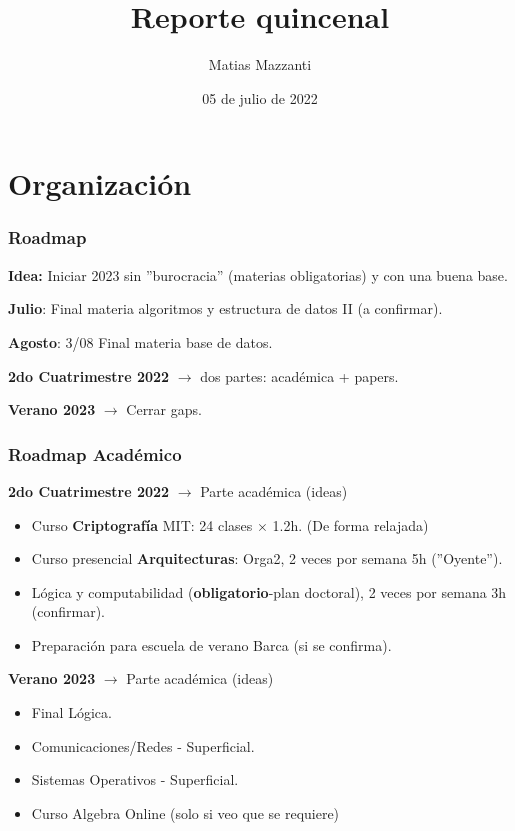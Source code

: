 \documentclass[10pt]{beamer}
\title[Reporte quincenal]{Reporte quincenal}
\author[Matias Mazzanti]{Matias Mazzanti}
\institute{UBA-IBM(?)}
\date{05 de julio de 2022}
\begin{document}
\begin{frame}

\maketitle

\end{frame}


\section{Organización}
\begin{frame}
\frametitle{Roadmap}
 \begin{mdframed}[backgroundcolor=frenchblue!20]
  \textbf{Idea:} Iniciar 2023 sin ''burocracia'' (materias obligatorias) y con una buena base.
 \end{mdframed}

  \textbf{Julio}:  Final materia algoritmos y estructura de datos II (a confirmar).

  \textbf{Agosto}: 3/08 Final materia base de datos.

  \textbf{2do Cuatrimestre 2022} $\rightarrow$ dos partes: académica + papers.


\textbf{Verano 2023} $\rightarrow$ Cerrar gaps.


\end{frame}

\begin{frame}
\frametitle{Roadmap Académico}

  \textbf{2do Cuatrimestre 2022} $\rightarrow$ Parte académica (ideas)


\begin{itemize}\itemsep-1em
  \item Curso \textbf{Criptografía} MIT: 24 clases $\times$ 1.2h. (De forma relajada)
  \item Curso presencial \textbf{Arquitecturas}: Orga2, 2 veces por semana 5h (''Oyente'').
  \item Lógica y computabilidad (\textbf{obligatorio}-plan doctoral), 2 veces por semana 3h (confirmar).
  \item Preparación para escuela de verano Barca (si se confirma).
\end{itemize}


  \textbf{Verano 2023} $\rightarrow$ Parte académica (ideas)

\begin{itemize}\itemsep-1em
  \item Final Lógica.
  \item Comunicaciones/Redes - Superficial.
  \item Sistemas Operativos - Superficial.
  \item Curso Algebra Online (solo si veo que se requiere)
\end{itemize}



\end{frame}
\end{document}
